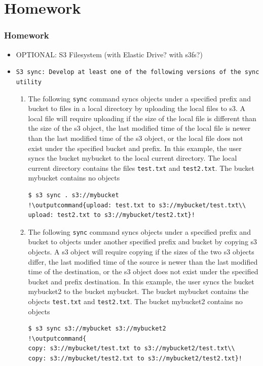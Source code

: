 \documentclass{beamer}
\newcommand{\outputcommand}[1]{\color{darkgreen}{#1}}
\begin{document}
\section{Homework}
\begin{frame}
\frametitle{Homework}
\begin{itemize}
\item  OPTIONAL: S3 Filesystem (with Elastic Drive? with s3fs?)
\item \texttt{S3 sync: Develop at least one of the following versions of the sync utility}
\begin{enumerate}
\item The following \texttt{sync} command syncs objects under a specified prefix and bucket to files in a local directory by uploading the local files to \acrshort{s3}. A local file will require uploading if the size of the local file is different than the size of the \acrshort{s3} object, the last modified time of the local file is newer than the last modified time of the \acrshort{s3} object, or the local file does not exist under the specified bucket and prefix. In this example, the user syncs the bucket mybucket to the local current directory. The local current directory contains the files \texttt{test.txt} and \texttt{test2.txt}. The bucket mybucket contains no objects

\lstset{language=shell}
\begin{lstlisting}[escapechar=!]
$ s3 sync . s3://mybucket
!\outputcommand{upload: test.txt to s3://mybucket/test.txt\\
upload: test2.txt to s3://mybucket/test2.txt}!
\end{lstlisting}

\item The following \texttt{sync} command syncs objects under a specified prefix and bucket to objects under another specified prefix and bucket by copying \acrshort{s3} objects. A \acrshort{s3} object will require copying if the sizes of the two \acrshort{s3} objects differ, the last modified time of the source is newer than the last modified time of the destination, or the \acrshort{s3} object does not exist under the specified bucket and prefix destination. In this example, the user syncs the bucket mybucket2 to the bucket mybucket. The bucket mybucket contains the objects \texttt{test.txt} and \texttt{test2.txt}. The bucket mybucket2 contains no objects

\lstset{language=shell}
\begin{lstlisting}[escapechar=!]
$ s3 sync s3://mybucket s3://mybucket2
!\outputcommand{
copy: s3://mybucket/test.txt to s3://mybucket2/test.txt\\
copy: s3://mybucket/test2.txt to s3://mybucket2/test2.txt}!
\end{lstlisting}



\end{enumerate}
\end{itemize}
\end{frame}
\end{document}
